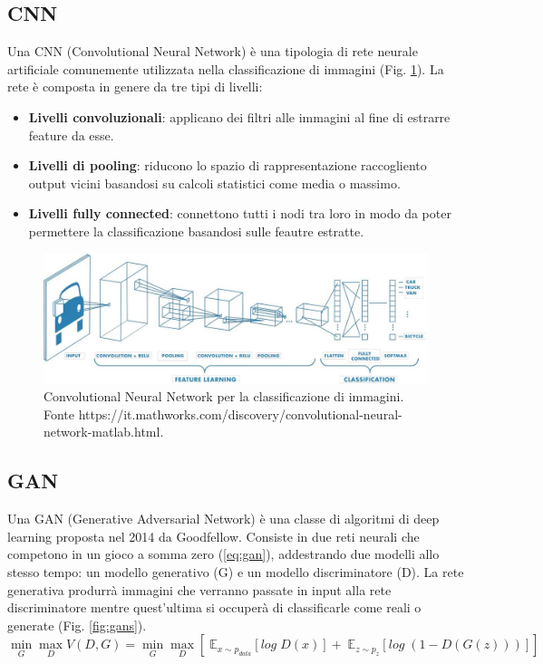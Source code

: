 		\subsection{CNN}
		Una CNN (Convolutional Neural Network) è una tipologia di rete neurale artificiale comunemente utilizzata nella classificazione di immagini (Fig. \ref{fig:cnn})\cite{cnn}. La rete è composta in genere da tre tipi di livelli:
		\begin{itemize}
			\item \textbf{Livelli convoluzionali}: applicano dei filtri alle immagini al fine di estrarre feature da esse.
			\item \textbf{Livelli di pooling}: riducono lo spazio di rappresentazione raccogliento output vicini basandosi su calcoli statistici come media o massimo.
			\item \textbf{Livelli fully connected}: connettono tutti i nodi tra loro in modo da poter permettere la classificazione basandosi sulle feautre estratte. 
		\end{itemize}
		\begin{figure}[h]
			\centering
			\includegraphics[width=0.7\linewidth]{figures/CNN}
			\caption{Convolutional Neural Network per la classificazione di immagini. Fonte https://it.mathworks.com/discovery/convolutional-neural-network-matlab.html.}
			\label{fig:cnn}
		\end{figure}
		
		\subsection{GAN}
			Una GAN (Generative Adversarial Network) è una classe di algoritmi di deep learning proposta nel 2014 da Goodfellow\cite{Goodfellow}. Consiste in due reti neurali che competono in un gioco a somma zero (\ref{eq:gan}), addestrando due modelli allo stesso tempo: un modello generativo (G) e un modello discriminatore (D).
			La rete generativa produrrà immagini che verranno passate in input alla rete discriminatore mentre quest'ultima si occuperà di classificarle come reali o generate (Fig. \ref{fig:gans}).
			\begin{equation}
				\min_G\max_D{V(D, G)} = \min_G\max_D \left[\; \mathbb{E}_{x \sim p_{data}}[log \; D(x)] + \; \mathbb{E}_{z \sim p_{z}}[log \; (1 - D(G(z)))] \right]
				\label{eq:gan}
			\end{equation}
			
